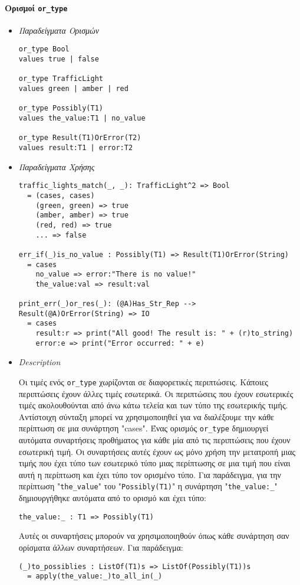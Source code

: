 \documentclass[diploma]{softlab-thesis}
\begin{document}
\newpage

\paragraph{Ορισμοί \texttt{or_type}}

\begin{itemize}
\item \textit{Παραδείγματα Ορισμών}

\begin{verbatim}
or_type Bool
values true | false

or_type TrafficLight
values green | amber | red

or_type Possibly(T1)
values the_value:T1 | no_value

or_type Result(T1)OrError(T2)
values result:T1 | error:T2
\end{verbatim}

\item \textit{Παραδείγματα Χρήσης}

\begin{verbatim}
traffic_lights_match(_, _): TrafficLight^2 => Bool
  = (cases, cases)
    (green, green) => true
    (amber, amber) => true
    (red, red) => true
    ... => false

err_if(_)is_no_value : Possibly(T1) => Result(T1)OrError(String)
  = cases
    no_value => error:"There is no value!"
    the_value:val => result:val

print_err(_)or_res(_): (@A)Has_Str_Rep --> Result(@A)OrError(String) => IO
  = cases
    result:r => print("All good! The result is: " + (r)to_string)
    error:e => print("Error occurred: " + e)
\end{verbatim}

\item \textit{Description}

Οι τιμές ενός \verb|or_type| χωρίζονται σε διαφορετικές περιπτώσεις. Κάποιες
περιπτώσεις έχουν άλλες τιμές εσωτερικά. Οι περιπτώσεις που έχουν εσωτερικές
τιμές ακολουθούνται από άνω κάτω τελεία και των τύπο της εσωτερικής τιμής.
Αντίστοιχη σύνταξη μπορεί να χρησιμοποιηθεί για να διαλέξουμε την κάθε
περίπτωση σε μια συνάρτηση "cases". Ένας ορισμός \verb|or_type| δημιουργεί
αυτόματα συναρτήσεις προθήματος για κάθε μία από τις περιπτώσεις που έχουν
εσωτερική τιμή. Οι συναρτήσεις αυτές έχουν ως μόνο χρήση την μετατροπή μιας
τιμής που έχει τύπο των εσωτερικό τύπο μιας περίπτωσης σε μια τιμή που είναι
αυτή η περίπτωση και έχει τύπο τον ορισμένο τύπο. Για παράδειγμα, για την
περίπτωση "\verb|the_value|" του "\verb|Possibly(T1)|" η συνάρτηση
"\verb|the_value:_|" δημιουργήθηκε αυτόματα από το ορισμό και έχει τύπο:
\begin{verbatim}
the_value:_ : T1 => Possibly(T1)
\end{verbatim}
Αυτές οι συναρτήσεις μπορούν να χρησιμοποιηθούν όπως κάθε συνάρτηση σαν
ορίσματα άλλων συναρτήσεων. Για παράδειγμα:
\begin{verbatim}
(_)to_possiblies : ListOf(T1)s => ListOf(Possibly(T1))s
  = apply(the_value:_)to_all_in(_)
\end{verbatim}

\end{itemize}
\end{document}
